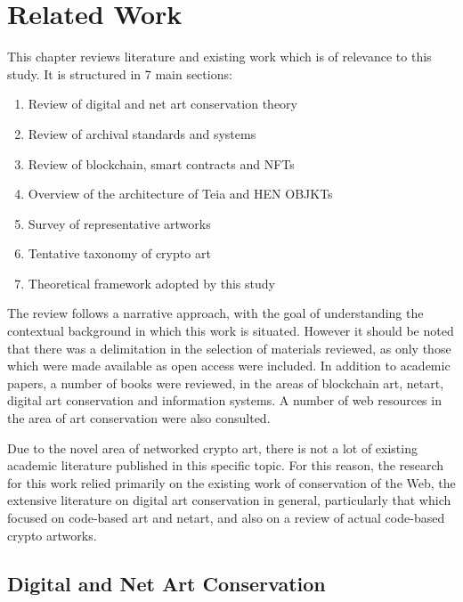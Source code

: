 \chapter{Related Work}
\label{chap:related_work}

This chapter reviews literature and existing work which is of relevance to this study. It is structured in 7 main sections:

\begin{enumerate}
    \item Review of digital and net art conservation theory
    \item Review of archival standards and systems
    \item Review of blockchain, smart contracts and NFTs
    \item Overview of the architecture of Teia and HEN OBJKTs
    \item Survey of representative artworks
    \item Tentative taxonomy of crypto art
    \item Theoretical framework adopted by this study
\end{enumerate}

\vspace{0.5cm}

The review follows a narrative approach, with the goal of understanding the contextual background in which this work is situated. However it should be noted that there was a delimitation in the selection of materials reviewed, as only those which were made available as open access were included. In addition to academic papers, a number of books were reviewed, in the areas of blockchain art, netart, digital art conservation and information systems. A number of web resources in the area of art conservation were also consulted. 

Due to the novel area of networked crypto art, there is not a lot of existing academic literature published in this specific topic. For this reason, the research for this work relied primarily on the existing work of conservation of the Web, the extensive literature on digital art conservation in general, particularly that which focused on code-based art and netart, and also on a review of actual code-based crypto artworks.

\section{Digital and Net Art Conservation}

